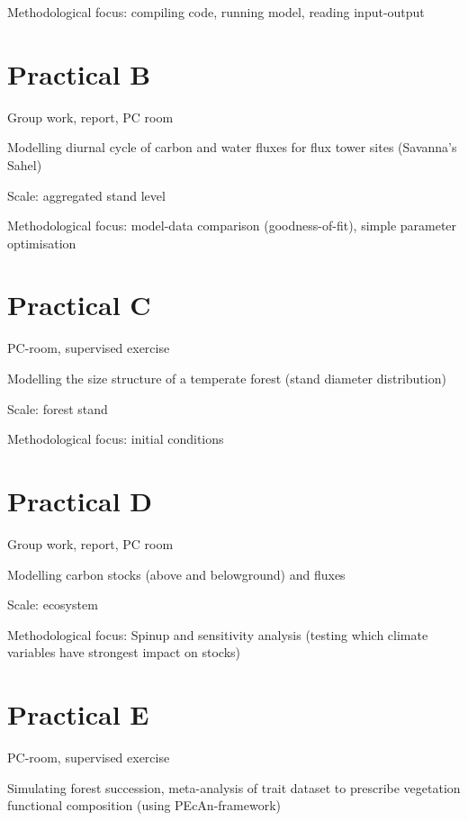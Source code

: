 \documentclass[oneside]{book}
\begin{document}
Methodological focus: compiling code, running model, reading
input-output

\chapter*{Practical B}\label{practical-b}

Group work, report, PC room

Modelling diurnal cycle of carbon and water fluxes for flux tower sites
(Savanna's Sahel)

Scale: aggregated stand level

Methodological focus: model-data comparison (goodness-of-fit), simple
parameter optimisation

\chapter*{Practical C}\label{practical-c}

PC-room, supervised exercise

Modelling the size structure of a temperate forest (stand diameter
distribution)

Scale: forest stand

Methodological focus: initial conditions

\chapter*{Practical D}\label{practical-d}

Group work, report, PC room

Modelling carbon stocks (above and belowground) and fluxes

Scale: ecosystem

Methodological focus: Spinup and sensitivity analysis (testing which
climate variables have strongest impact on stocks)

\chapter*{Practical E}\label{practical-e}

PC-room, supervised exercise

Simulating forest succession, meta-analysis of trait dataset to
prescribe vegetation functional composition (using PEcAn-framework)
\end{document}
